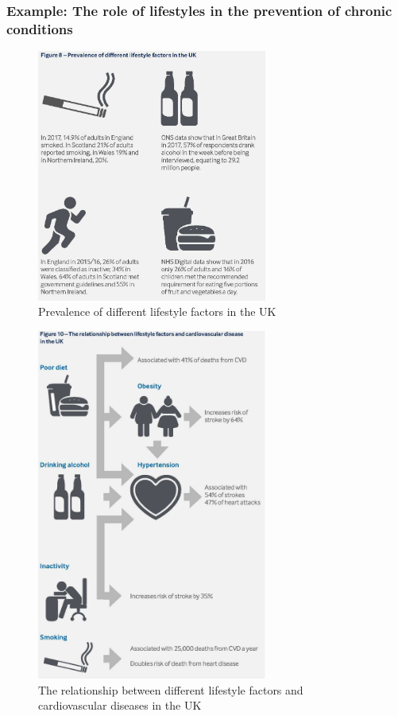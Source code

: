             \subsubsection{Example: The role of lifestyles in the prevention of chronic conditions}         
            \begin{figure}[H]%
                    \centering
                    \includegraphics[width=3in]{images/ch3/15.png}
                    \caption{Prevalence of different lifestyle factors in the UK}
                \end{figure} 
            \begin{figure}[H]%
                    \centering
                    \includegraphics[width=3in]{images/ch3/16.png}
                    \caption{The relationship between different lifestyle factors and cardiovascular diseases in the UK}
                \end{figure} 

